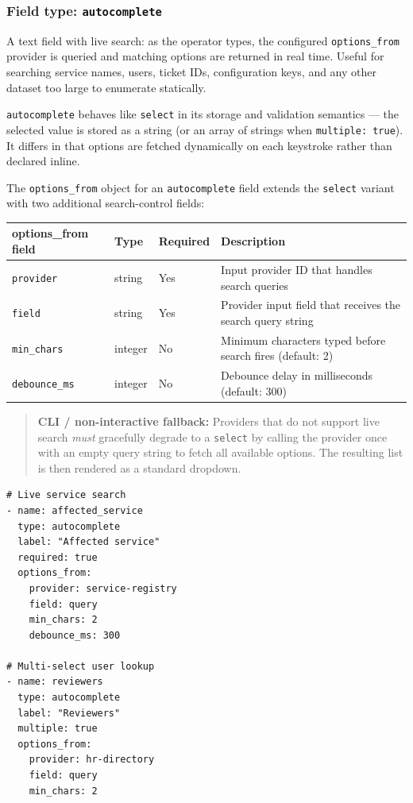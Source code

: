 \subsubsection{Field type: \texttt{autocomplete}}
\label{subsubsec:field-autocomplete}

A text field with live search: as the operator types, the configured
\texttt{options\_from} provider is queried and matching options are returned
in real time.  Useful for searching service names, users, ticket IDs,
configuration keys, and any other dataset too large to enumerate statically.

\texttt{autocomplete} behaves like \texttt{select} in its storage and
validation semantics — the selected value is stored as a string (or an
array of strings when \texttt{multiple: true}).  It differs in that options
are fetched dynamically on each keystroke rather than declared inline.

The \texttt{options\_from} object for an \texttt{autocomplete} field extends
the \texttt{select} variant with two additional search-control fields:

\begin{center}
\begin{tabular}{lllp{4.5cm}}
\hline
\textbf{options\_from field} & \textbf{Type} & \textbf{Required} & \textbf{Description} \\
\hline
\texttt{provider}     & string  & Yes & Input provider ID that handles search queries \\
\texttt{field}        & string  & Yes & Provider input field that receives the search query string \\
\texttt{min\_chars}   & integer & No  & Minimum characters typed before search fires (default: 2) \\
\texttt{debounce\_ms} & integer & No  & Debounce delay in milliseconds (default: 300) \\
\hline
\end{tabular}
\end{center}

\begin{quote}
\textbf{CLI / non-interactive fallback:} Providers that do not support
live search \emph{must} gracefully degrade to a \texttt{select} by calling
the provider once with an empty query string to fetch all available options.
The resulting list is then rendered as a standard dropdown.
\end{quote}

\begin{verbatim}
# Live service search
- name: affected_service
  type: autocomplete
  label: "Affected service"
  required: true
  options_from:
    provider: service-registry
    field: query
    min_chars: 2
    debounce_ms: 300

# Multi-select user lookup
- name: reviewers
  type: autocomplete
  label: "Reviewers"
  multiple: true
  options_from:
    provider: hr-directory
    field: query
    min_chars: 2
\end{verbatim}

